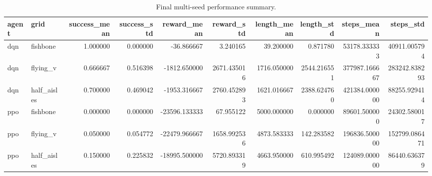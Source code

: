 \begin{table}
\caption{Final multi-seed performance summary.}
\label{tab:final_mean_std}
\begin{tabular}{llrrrrrrrr}
\toprule
agent & grid & success_mean & success_std & reward_mean & reward_std & length_mean & length_std & steps_mean & steps_std \\
\midrule
dqn & fishbone & 1.000000 & 0.000000 & -36.866667 & 3.240165 & 39.200000 & 0.871780 & 53178.333333 & 40911.005794 \\
dqn & flying_v & 0.666667 & 0.516398 & -1812.650000 & 2671.435016 & 1716.050000 & 2544.216551 & 377987.166667 & 283242.838293 \\
dqn & half_aisles & 0.700000 & 0.469042 & -1953.316667 & 2760.452893 & 1621.016667 & 2388.624760 & 421384.000000 & 88255.929414 \\
ppo & fishbone & 0.000000 & 0.000000 & -23596.133333 & 67.955122 & 5000.000000 & 0.000000 & 89601.500000 & 24302.580017 \\
ppo & flying_v & 0.050000 & 0.054772 & -22479.966667 & 1658.992536 & 4873.583333 & 142.283582 & 196836.500000 & 152799.086471 \\
ppo & half_aisles & 0.150000 & 0.225832 & -18995.500000 & 5720.893319 & 4663.950000 & 610.995492 & 124089.000000 & 86440.636379 \\
\bottomrule
\end{tabular}
\end{table}
